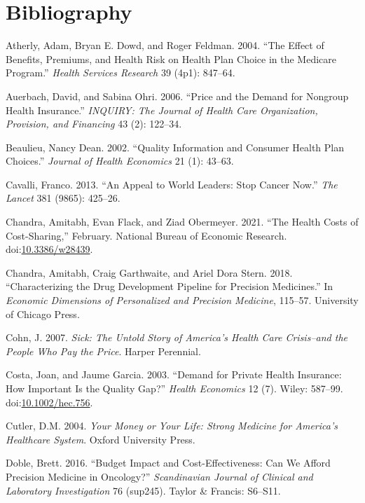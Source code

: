 \documentclass[a4paper,12pt]{article}
\begin{document}
\section{Bibliography}
\label{sec:org1a4c18f}

\hypertarget{citeproc_bib_item_1}{Atherly, Adam, Bryan E. Dowd, and Roger Feldman. 2004. “The Effect of Benefits, Premiums, and Health Risk on Health Plan Choice in the Medicare Program.” \textit{Health Services Research} 39 (4p1): 847–64.}

\hypertarget{citeproc_bib_item_2}{Auerbach, David, and Sabina Ohri. 2006. “Price and the Demand for Nongroup Health Insurance.” \textit{INQUIRY: The Journal of Health Care Organization, Provision, and Financing} 43 (2): 122–34.}

\hypertarget{citeproc_bib_item_3}{Beaulieu, Nancy Dean. 2002. “Quality Information and Consumer Health Plan Choices.” \textit{Journal of Health Economics} 21 (1): 43–63.}

\hypertarget{citeproc_bib_item_4}{Cavalli, Franco. 2013. “An Appeal to World Leaders: Stop Cancer Now.” \textit{The Lancet} 381 (9865): 425–26.}

\hypertarget{citeproc_bib_item_5}{Chandra, Amitabh, Evan Flack, and Ziad Obermeyer. 2021. “The Health Costs of Cost-Sharing,” February. National Bureau of Economic Research. doi:\href{https://doi.org/10.3386/w28439}{10.3386/w28439}.}

\hypertarget{citeproc_bib_item_6}{Chandra, Amitabh, Craig Garthwaite, and Ariel Dora Stern. 2018. “Characterizing the Drug Development Pipeline for Precision Medicines.” In \textit{Economic Dimensions of Personalized and Precision Medicine}, 115–57. University of Chicago Press.}

\hypertarget{citeproc_bib_item_7}{Cohn, J. 2007. \textit{Sick: The Untold Story of America’s Health Care Crisis–and the People Who Pay the Price}. Harper Perennial.}

\hypertarget{citeproc_bib_item_8}{Costa, Joan, and Jaume Garcia. 2003. “Demand for Private Health Insurance: How Important Is the Quality Gap?” \textit{Health Economics} 12 (7). Wiley: 587–99. doi:\href{https://doi.org/10.1002/hec.756}{10.1002/hec.756}.}

\hypertarget{citeproc_bib_item_9}{Cutler, D.M. 2004. \textit{Your Money or Your Life: Strong Medicine for America’s Healthcare System}. Oxford University Press.}

\hypertarget{citeproc_bib_item_10}{Doble, Brett. 2016. “Budget Impact and Cost-Effectiveness: Can We Afford Precision Medicine in Oncology?” \textit{Scandinavian Journal of Clinical and Laboratory Investigation} 76 (sup245). Taylor \& Francis: S6–S11.}
\end{document}
